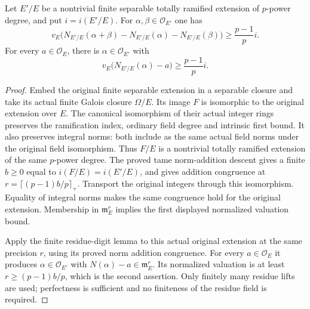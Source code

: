 \begin{proposition}
\label{fw:norm-estimates}
\leanok
Let $E'/E$ be a nontrivial finite separable totally ramified extension of
$p$-power degree, and put $i=i(E'/E)$.
For $\alpha,\beta\in\mathcal O_{E'}$ one has
\[
 v_E\bigl(N_{E'/E}(\alpha+\beta)
            -N_{E'/E}(\alpha)-N_{E'/E}(\beta)\bigr)
       \geq\frac{p-1}{p}i.
\]
For every $a\in\mathcal O_E$, there is $\alpha\in\mathcal O_{E'}$ with
\[
 v_E\bigl(N_{E'/E}(\alpha)-a\bigr)\geq\frac{p-1}{p}i.
\]
\end{proposition}
\begin{proof}
Embed the original finite separable extension in a separable closure
and take its actual finite Galois closure $\Omega/E$. Its image $F$
is isomorphic to the original extension over $E$. The canonical
isomorphism of their actual integer rings preserves the
ramification index, ordinary field degree and intrinsic first
bound. It also preserves integral norms: both include as the
same actual field norms under the original field isomorphism.
Thus $F/E$ is a nontrivial totally ramified extension of the same
$p$-power degree. The proved tame norm-addition descent gives a
finite $b\geq0$ equal to $i(F/E)=i(E'/E)$, and gives addition
congruence at $r=\lceil(p-1)b/p\rceil_+$. Transport the original
integers through this isomorphism. Equality of integral norms
makes the same congruence hold for the original extension.
Membership in $\mathfrak m_E^r$ implies the first displayed
normalized valuation bound.

Apply the finite residue-digit lemma to this actual original
extension at the same precision $r$, using its proved norm
addition congruence. For every $a\in\mathcal O_E$ it produces
$\alpha\in\mathcal O_{E'}$ with
$N(\alpha)-a\in\mathfrak m_E^r$. Its normalized valuation is at
least $r\geq(p-1)b/p$, which is the second assertion. Only
finitely many residue lifts are used; perfectness is sufficient
and no finiteness of the residue field is required.
\end{proof}

